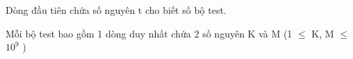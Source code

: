 Dòng đầu tiên chứa số nguyên t cho biết số bộ test.

Mỗi bộ test bao gồm 1 dòng duy nhất chứa 2 số nguyên K và M (1  $\le$  K, M  $\le$  $10^{9}$ )